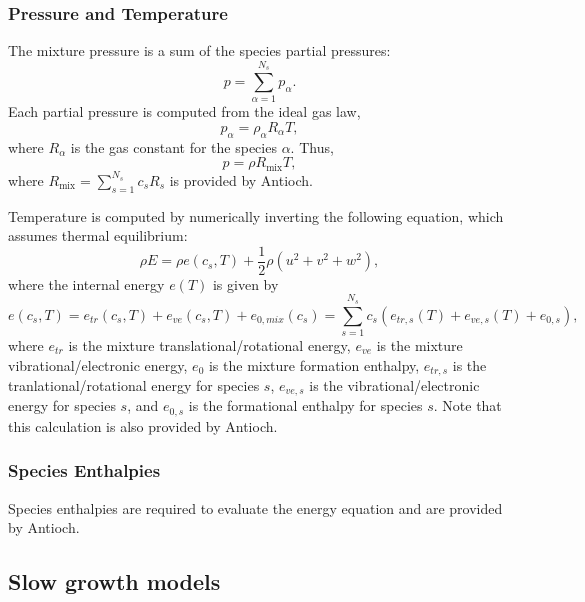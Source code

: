 \subsubsection{Pressure and Temperature} \label{sec:PandT}
The mixture pressure is a sum of the species partial pressures:
%
\begin{equation*}
p = \sum_{\alpha = 1}^{N_s} p_{\alpha}.
\end{equation*}
%
Each partial pressure is computed from the ideal gas law,
%
\begin{equation*}
p_{\alpha} = \rho_{\alpha} R_{\alpha} T,
\end{equation*}
% 
where $R_{\alpha}$ is the gas constant for the species $\alpha$.  Thus,
%
\begin{equation*}
p = \rho R_{\mathrm{mix}} T,
\end{equation*}
% 
where $R_{\mathrm{mix}} = \sum_{s=1}^{N_s} c_s R_s$ is provided by Antioch.

Temperature is computed by numerically inverting the following
equation, which assumes thermal equilibrium:
%
\begin{equation*}
\rho E = \rho e(c_s,T) + \frac{1}{2} \rho (u^2 + v^2 + w^2),
\end{equation*}
%
where the internal energy $e(T)$ is given by
%
\begin{equation*}
e(c_s, T) = e_{tr}(c_s, T) + e_{ve}(c_s, T) + e_{0,mix}(c_s) = \sum_{s=1}^{N_s} c_s \left( e_{tr,s}(T) + e_{ve,s}(T) + e_{0,s} \right),
\end{equation*}
%
where $e_{tr}$ is the mixture translational/rotational energy,
$e_{ve}$ is the mixture vibrational/electronic energy, $e_0$ is the
mixture formation enthalpy, $e_{tr,s}$ is the tranlational/rotational
energy for species $s$, $e_{ve,s}$ is the vibrational/electronic
energy for species $s$, and $e_{0,s}$ is the formational enthalpy for
species $s$.  Note that this calculation is also provided by Antioch.

\subsubsection{Species Enthalpies}
Species enthalpies are required to evaluate the energy equation and
are provided by Antioch.

\subsection{Slow growth models}
\label{sec:slowgrowthmodels}







